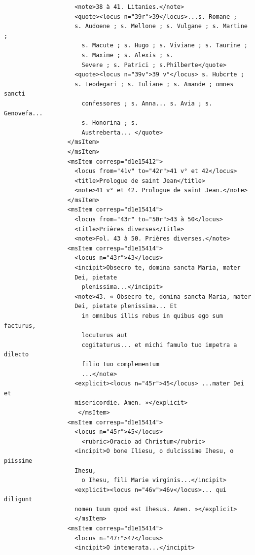 \documentclass[a4paper,12pt,twoside]{book}
\begin{document}
\begin{verbatim}
                    <note>38 à 41. Litanies.</note>
                    <quote><locus n="39r">39</locus>...s. Romane ; 
                    s. Audoene ; s. Mellone ; s. Vulgane ; s. Martine ;
                      s. Macute ; s. Hugo ; s. Viviane ; s. Taurine ;
                      s. Maxime ; s. Alexis ; s.
                      Severe ; s. Patrici ; s.Philberte</quote>
                    <quote><locus n="39v">39 v°</locus> s. Hubcrte ; 
                    s. Leodegari ; s. Iuliane ; s. Amande ; omnes sancti
                      confessores ; s. Anna... s. Avia ; s. Genovefa... 
                      s. Honorina ; s.
                      Austreberta... </quote>
                  </msItem>
                  </msItem>
                  <msItem corresp="d1e15412">
                    <locus from="41v" to="42r">41 v° et 42</locus>
                    <title>Prologue de saint Jean</title>
                    <note>41 v° et 42. Prologue de saint Jean.</note>
                  </msItem>
                  <msItem corresp="d1e15414">
                    <locus from="43r" to="50r">43 à 50</locus>
                    <title>Prières diverses</title>
                    <note>Fol. 43 à 50. Prières diverses.</note>
                  <msItem corresp="d1e15414">
                    <locus n="43r">43</locus>
                    <incipit>Obsecro te, domina sancta Maria, mater 
                    Dei, pietate
                      plenissima...</incipit>
                    <note>43. « Obsecro te, domina sancta Maria, mater
                    Dei, pietate plenissima... Et
                      in omnibus illis rebus in quibus ego sum facturus, 
                      locuturus aut
                      cogitaturus... et michi famulo tuo impetra a dilecto 
                      filio tuo complementum
                      ...</note>
                    <explicit><locus n="45r">45</locus> ...mater Dei et 
                    misericordie. Amen. »</explicit>
                     </msItem>
                  <msItem corresp="d1e15414">
                    <locus n="45r">45</locus>
                      <rubric>Oracio ad Christum</rubric>
                    <incipit>O bone Iliesu, o dulcissime Ihesu, o piissime 
                    Ihesu,
                      o Ihesu, fili Marie virginis...</incipit>
                    <explicit><locus n="46v">46v</locus>... qui diligunt
                    nomen tuum quod est Ihesus. Amen. »</explicit>
                    </msItem>
                  <msItem corresp="d1e15414">
                    <locus n="47r">47</locus>
                    <incipit>O intemerata...</incipit>

\end{verbatim}
\end{document}
